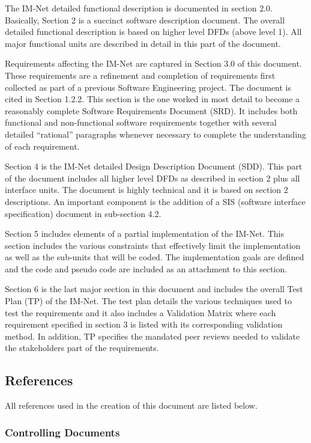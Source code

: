 \documentclass[letterpaper,12pt]{article}
\begin{document}
{The IM-Net detailed functional description is documented in section 2.0. Basically, Section 2 is a succinct software description document. The overall detailed functional description is based on higher level DFDs (above level 1). All major functional units are described in detail in this part of the document.

Requirements affecting the IM-Net are captured in Section 3.0 of this document.  These requirements are a refinement and completion of requirements first collected as part of a previous Software Engineering project. The document is cited in Section 1.2.2. This section is the one worked in most detail to become a reasonably complete Software Requirements Document (SRD). It includes both functional and non-functional software requirements together with several detailed ``rational'' paragraphs whenever necessary to complete the understanding of each requirement.

Section 4 is the IM-Net detailed Design Description Document (SDD). This part of the document includes all higher level DFDs as described in section 2 plus all interface units. The document is highly technical and it is based on section 2 descriptions. An important component is the addition of a SIS (software interface specification) document in sub-section 4.2.

Section 5 includes elements of a partial implementation of the IM-Net. This section includes the various constraints that effectively limit the implementation as well as the sub-units that will be coded. The implementation goals are defined and the code and pseudo code are included as an attachment to this section.  

Section 6 is the last major section in this document and includes the overall Test Plan (TP) of the IM-Net. The test plan details the various techniques used to test the requirements and it also includes a Validation Matrix where each requirement specified in section 3 is listed with its corresponding validation method. In addition, TP specifies the mandated peer reviews needed to validate the stakeholders part of the requirements.

 
\textcolor{subsection}{\subsection{References}}

All references used in the creation of this document are listed below.

\textcolor{subsubsection}{\subsubsection{Controlling Documents}}

}
\end{document}
